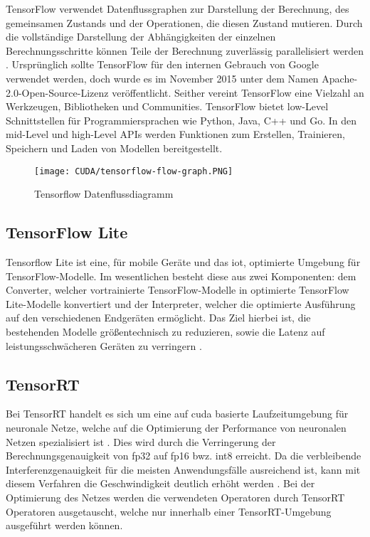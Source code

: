 TensorFlow verwendet Datenflussgraphen zur Darstellung der Berechnung, des gemeinsamen Zustands und der Operationen, die diesen Zustand mutieren. Durch die vollständige Darstellung der Abhängigkeiten der einzelnen Berechnungsschritte können Teile der Berechnung zuverlässig parallelisiert werden \cite{Abadi:2016}. 
Ursprünglich sollte TensorFlow für den internen Gebrauch von Google verwendet werden, doch wurde
es im November 2015 unter dem Namen Apache-2.0-Open-Source-Lizenz veröffentlicht.
Seither vereint TensorFlow eine Vielzahl an Werkzeugen, Bibliotheken und Communities.
TensorFlow bietet low-Level Schnittstellen für Programmiersprachen wie Python, Java,
C++ und Go. In den mid-Level und high-Level APIs werden Funktionen zum Erstellen,
Trainieren, Speichern und Laden von Modellen bereitgestellt. \cite{Chollet:2018} %

\begin{figure}[htb]
	\centering
	\texttt{[image: CUDA/tensorflow-flow-graph.PNG]}
	\caption[Tensorflow Datenflussdiagramm]{Tensorflow Datenflussdiagramm \cite{Abadi:2016}}
	\label{fig:tensorflow-flow}
\end{figure}



\subsection{TensorFlow Lite}

Tensorflow Lite ist eine, für mobile Geräte und das \ac{iot}, optimierte Umgebung für TensorFlow-Modelle. Im wesentlichen besteht diese aus zwei Komponenten: dem Converter, welcher vortrainierte TensorFlow-Modelle in optimierte TensorFlow Lite-Modelle konvertiert und der Interpreter, welcher die optimierte Ausführung auf den verschiedenen Endgeräten ermöglicht. Das Ziel hierbei ist, die bestehenden Modelle größentechnisch zu reduzieren, sowie die Latenz auf leistungsschwächeren Geräten zu verringern \cite{GoogleTensorFlowLiteGuide:2020}.

\subsection{TensorRT}\label{sec:tensorrt}

Bei TensorRT handelt es sich um eine auf \ac{cuda} basierte Laufzeitumgebung für neuronale Netze, welche auf die Optimierung der Performance von neuronalen Netzen spezialisiert ist \cite{TensorRT:2015}. Dies wird durch die Verringerung der Berechnungsgenauigkeit von \ac{fp32} auf \ac{fp16} bwz. \ac{int8} erreicht. Da die verbleibende Interferenzgenauigkeit für die meisten Anwendungsfälle ausreichend ist, kann mit diesem Verfahren die Geschwindigkeit deutlich erhöht werden \cite{Gysel:2016}. Bei der Optimierung des Netzes werden die verwendeten Operatoren durch TensorRT Operatoren ausgetauscht, welche nur innerhalb einer TensorRT-Umgebung ausgeführt werden können.


